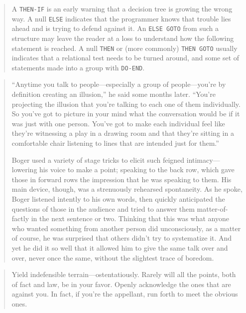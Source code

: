 \documentclass[a4paper]{article}
\begin{document}
\medskip
\begin{quote}
	A \texttt{THEN-IF} is an early warning that a decision tree is growing
	the wrong way.  A null \texttt{ELSE} indicates that the programmer knows
	that trouble lies ahead and is trying to defend against it.  An \texttt{ELSE GOTO}
	from such a structure may leave the reader at a loss to understand how the
	following statement is reached.  A null \texttt{THEN} or (more commonly)
	\texttt{THEN GOTO} usually indicates that a relational test needs to be
	turned around, and some set of statements made into a group with
	\texttt{DO-END}.~\cite{Kernighan1978}
\end{quote}

\medskip
\begin{quote}
	``Anytime you talk to people---especially a group of people---you're by
	definition creating an illusion,'' he said some months later.  ``You're
	projecting the illusion that you're talking to each one of them
	individually.  So you've got to picture in your mind what the conversation
	would be if it was just with one person.  You've got to make each
	individual feel like they're witnessing a play in a drawing room and that
	they're sitting in a comfortable chair listening to lines that are intended
	just for them.''

	Boger used a variety of stage tricks to elicit such feigned intimacy---lowering
	his voice to make a point; speaking to the back row, which gave those in
	forward rows the impression that he was speaking to them.  His main device,
	though, was a strenuously rehearsed spontaneity.  As he spoke, Boger listened
	intently to his own words, then quickly anticipated the questions of those in
	the audience and tried to answer them matter-of-factly in the next sentence
	or two.  Thinking that this was what anyone who wanted something from another
	person did unconsciously, as a matter of course, he was surprised that others
	didn't try to systematize it.  And yet he did it so well that it allowed him
	to give the same talk over and over, never once the same, without the slightest
	trace of boredom.~\cite{Werth1994}
\end{quote}

\medskip
\begin{quote}
	Yield indefensible terrain---ostentatiously.  
	Rarely will all the points, both of fact and law, be in your favor.
	Openly acknowledge the ones that are against you. In fact, if you're
	the appellant, run forth to meet the obvious ones.~\cite{Scalia2008,Slater2008}
\end{quote}
\end{document}
